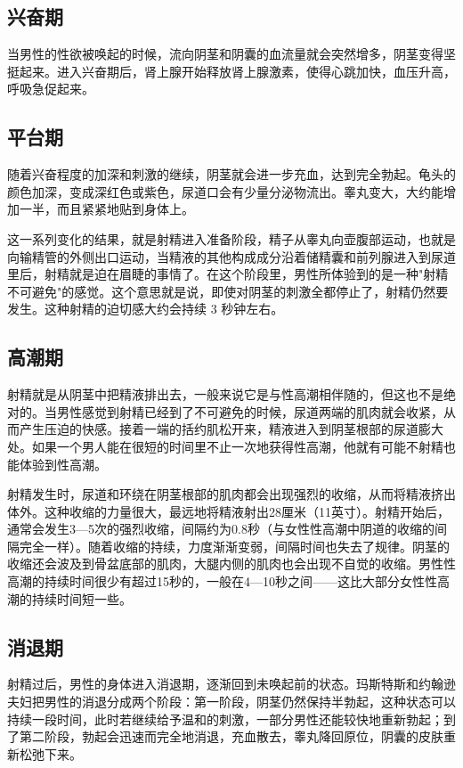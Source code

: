\subsection{兴奋期}

当男性的性欲被唤起的时候，流向阴茎和阴囊的血流量就会突然增多，阴茎变得坚挺起来。进入兴奋期后，肾上腺开始释放肾上腺激素，使得心跳加快，血压升高，呼吸急促起来。

\subsection{平台期}

随着兴奋程度的加深和刺激的继续，阴茎就会进一步充血，达到完全勃起。龟头的颜色加深，变成深红色或紫色，尿道口会有少量分泌物流出。睾丸变大，大约能增加一半，而且紧紧地贴到身体上。

这一系列变化的结果，就是射精进入准备阶段，精子从睾丸向壶腹部运动，也就是向输精管的外侧出口运动，当精液的其他构成成分沿着储精囊和前列腺进入到尿道里后，射精就是迫在眉睫的事情了。在这个阶段里，男性所体验到的是一种"射精不可避免"的感觉。这个意思就是说，即使对阴茎的刺激全都停止了，射精仍然要发生。这种射精的迫切感大约会持续 3 秒钟左右。

\subsection{高潮期}

射精就是从阴茎中把精液排出去，一般来说它是与性高潮相伴随的，但这也不是绝对的。当男性感觉到射精已经到了不可避免的时候，尿道两端的肌肉就会收紧，从而产生压迫的快感。接着一端的括约肌松开来，精液进入到阴茎根部的尿道膨大处。如果一个男人能在很短的时间里不止一次地获得性高潮，他就有可能不射精也能体验到性高潮。

射精发生时，尿道和环绕在阴茎根部的肌肉都会出现强烈的收缩，从而将精液挤出体外。这种收缩的力量很大，最远地将精液射出28厘米（11英寸）。射精开始后，通常会发生3—5次的强烈收缩，间隔约为0.8秒（与女性性高潮中阴道的收缩的间隔完全一样）。随着收缩的持续，力度渐渐变弱，间隔时间也失去了规律。阴茎的收缩还会波及到骨盆底部的肌肉，大腿内侧的肌肉也会出现不自觉的收缩。男性性高潮的持续时间很少有超过15秒的，一般在4—10秒之间——这比大部分女性性高潮的持续时间短一些。

\subsection{消退期}

射精过后，男性的身体进入消退期，逐渐回到未唤起前的状态。玛斯特斯和约翰逊夫妇把男性的消退分成两个阶段：第一阶段，阴茎仍然保持半勃起，这种状态可以持续一段时间，此时若继续给予温和的刺激，一部分男性还能较快地重新勃起；到了第二阶段，勃起会迅速而完全地消退，充血散去，睾丸降回原位，阴囊的皮肤重新松弛下来。

